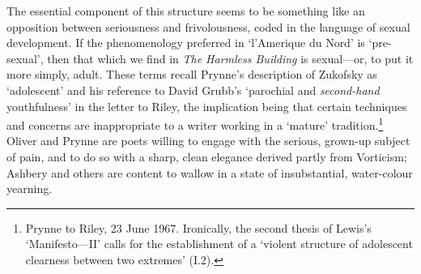 \documentclass[]{article}
\begin{document}
The essential component of this structure seems to be something like an
opposition between seriousness and frivolousness, coded in the language
of sexual development. If the phenomenology preferred in `l'Amerique du
Nord' is `pre-sexual', then that which we find in \emph{The Harmless
Building} is sexual---or, to put it more simply, adult. These terms
recall Prynne's description of Zukofsky as `adolescent' and his
reference to David Grubb's `parochial and \emph{second-hand}
youthfulness' in the letter to Riley, the implication being that certain
techniques and concerns are inappropriate to a writer working in a
`mature' tradition.\footnote{Prynne to Riley, 23 June 1967. Ironically,
  the second thesis of Lewis's `Manifesto---II' calls for the
  establishment of a `violent structure of adolescent clearness between
  two extremes' (I.2).} Oliver and Prynne are poets willing to engage
with the serious, grown-up subject of pain, and to do so with a sharp,
clean elegance derived partly from Vorticism; Ashbery and others are
content to wallow in a state of insubstantial, water-colour yearning.
\end{document}
